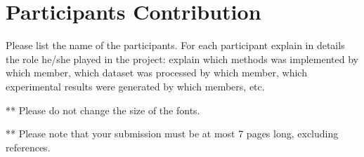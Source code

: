 \documentclass[11.5pt]{article}
\begin{document}
\section{Participants Contribution}
Please list the name of the participants. For each participant explain in details the role he/she played in the project: explain which methods was implemented by which member, which dataset was processed by which member, which experimental results were generated by which members, etc.

\vspace{10mm}
** Please do not change the size of the fonts.

** Please note that your submission must be at most 7 pages long, excluding references.
\end{document}
